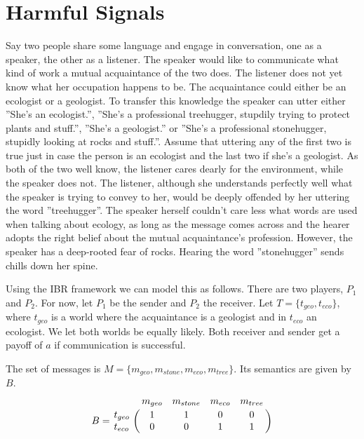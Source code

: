 \documentclass[10pt]{article}
\begin{document}
\section{Harmful Signals}
Say two people share some language and engage in conversation, one as a speaker, the other as a listener. The speaker would like to communicate what kind of work a mutual acquaintance of the two does. The listener does not yet know what her occupation happens to be. The acquaintance could either be an ecologist or a geologist. To transfer this knowledge the speaker can utter either ''She's an ecologist.'', ''She's a professional treehugger, stupdily trying to protect plants and stuff.'', ''She's a geologist.'' or ''She's a professional stonehugger, stupidly looking at rocks and stuff.''. Assume that uttering any of the first two is true just in case the person is an ecologist and the last two if she's a geologist. As both of the two well know, the listener cares dearly for the environment, while the speaker does not. The listener, although she understands perfectly well what the speaker is trying to convey to her, would be deeply offended by her uttering the word ''treehugger''. The speaker herself couldn't care less what words are used when talking about ecology, as long as the message comes across and the hearer adopts the right belief about the mutual acquaintance's profession. However, the speaker has a deep-rooted fear of rocks. Hearing the word ''stonehugger'' sends chills down her spine.

Using the IBR framework we can model this as follows.
There are two players, $P_1$ and $P_2$. For now, let $P_1$ be the sender and $P_2$ the receiver. Let $T=\{t_{geo}, t_{eco}\}$, where $t_{geo}$ is a world where the acquaintance is a geologist and in $t_{eco}$ an ecologist. We let both worlds be equally likely. Both receiver and sender get a payoff of $a$ if communication is successful.

The set of messages is $M=\{m_{geo}, m_{stone}, m_{eco}, m_{tree}\}$. Its semantics are given by $B$.
 \begin{equation*}
 B =
 \bordermatrix{
            & m_{geo} & m_{stone} & m_{eco} & m_{tree}    \cr
   t_{geo}  &       1 &         1 & 0       & 0 \cr
   t_{eco}  &       0 &         0 & 1       & 1
 }
 \end{equation*}
\end{document}
